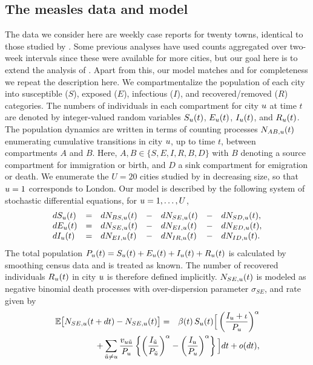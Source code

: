 \documentclass[12pt]{article}\usepackage[]{graphicx}\usepackage[]{xcolor}
\begin{document}
\subsection{The measles data and model}
\label{sec:model}

The data we consider here are weekly case reports for twenty towns, identical to those studied by \citet{he10}.
Some previous analyses have used counts aggregated over two-week intervals \citep{park20,ionides21} since these were available for more cities, but our goal here is to extend the analysis of \citet{he10}.
Apart from this, our model matches \citet{ionides21} and for completeness we repeat the description here.
We compartmentalize the population of each city into susceptible ($S$), exposed ($E$), infectious ($I$), and recovered/removed ($R$) categories.
The numbers of individuals in each compartment for city $u$ at time $t$ are denoted by integer-valued random variables $S_u(t)$, $E_u(t)$, $I_u(t)$, and $R_u(t)$.
The population dynamics are written in terms of counting processes $N_{AB,u}(t)$ enumerating cumulative transitions in city $u$, up to time $t$, between compartments $A$ and $B$.
Here, $A,B\in \{S,E,I,R,B,D\}$ with $B$ denoting a source compartment for immigration or birth, and $D$ a sink compartment for emigration or death.
We enumerate the $U=20$ cities studied by \citet{he10} in decreasing size, so that $u=1$ corresponds to London.
Our model is described by the following system of stochastic differential equations, for $u=1,\dots, U$,
\begin{equation}
\nonumber
\begin{array}{lllllll}
\displaystyle dS_u(t) &=& dN_{BS,u}(t) &-& dN_{SE,u}(t) &-& dN_{SD,u}(t), \\
\displaystyle dE_u(t) &=& dN_{SE,u}(t) &-& dN_{EI,u}(t) &-& dN_{ED,u}(t), \\
\displaystyle dI_u(t) &=& dN_{EI,u}(t) &-& dN_{IR,u}(t) &-& dN_{ID,u}(t). 
\end{array}
\end{equation}
The total population $P_u(t)=S_u(t)+E_u(t)+I_u(t)+R_u(t)$ is calculated by smoothing census data and is treated as known.
The number of recovered individuals $R_u(t)$ in city $u$ is therefore defined implicitly.
$N_{SE,u}(t)$ is modeled as negative binomial death processes \citep{breto09,breto11}
with over-dispersion parameter $\sigma_{SE}$, and rate given by
\begin{eqnarray}
\nonumber
\mathbb{E} \big[ N_{SE,\unit}(t+dt) - N_{SE,\unit}(t) \big] 
&=& 
\beta(t) \, S_\unit(t) 
\Big[ 
  \left( \frac{I_\unit+\iota}{P_\unit} \right)^\alpha
\\
\label{eq:dEdt}
&& \hspace{-3.8cm}
 + \sum_{\altUnit \neq \unit} \frac{v_{\unit\altUnit}}{P_\unit} 
  \left\{ 
    \left(
      \frac{ I_{\altUnit} }{ P_{\altUnit} }
    \right)^\alpha - 
    \left(
      \frac{I_\unit}{P_\unit}  
    \right)^\alpha
  \right\}
\Big] dt + o(dt),\label{eqn:transmissionrate}
\end{eqnarray}
\end{document}
